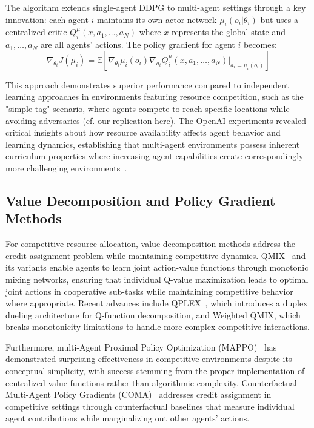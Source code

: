 The algorithm extends single-agent DDPG to multi-agent settings through a key innovation: each agent $i$ maintains its own actor network $\mu_i(o_i|\theta_i)$ but uses a centralized critic $Q_i^\mu(x, a_1, \ldots, a_N)$ where $x$ represents the global state and $a_1, \ldots, a_N$ are all agents' actions. The policy gradient for agent $i$ becomes:
\begin{equation}
    \nabla_{\theta_i} J(\mu_i) = \mathbb{E}[\nabla_{\theta_i} \mu_i(o_i) \nabla_{a_i} Q_i^\mu(x, a_1, \ldots, a_N)|_{a_i=\mu_i(o_i)}]
\end{equation}

This approach demonstrates superior performance compared to independent learning approaches in environments featuring resource competition, such as the "simple tag" scenario, where agents compete to reach specific locations while avoiding adversaries (cf. our replication here). The OpenAI experiments revealed critical insights about how resource availability affects agent behavior and learning dynamics, establishing that multi-agent environments possess inherent curriculum properties where increasing agent capabilities create correspondingly more challenging environments~\autocite{lowe_learning_2017}.

\subsection{Value Decomposition and Policy Gradient Methods}

For competitive resource allocation, value decomposition methods address the credit assignment problem while maintaining competitive dynamics. QMIX~\autocite{rashid_monotonic_2020} and its variants enable agents to learn joint action-value functions through monotonic mixing networks, ensuring that individual Q-value maximization leads to optimal joint actions in cooperative sub-tasks while maintaining competitive behavior where appropriate. Recent advances include QPLEX~\autocite{wang_qplex_2021}, which introduces a duplex dueling architecture for Q-function decomposition, and Weighted QMIX, which breaks monotonicity limitations to handle more complex competitive interactions.

Furthermore, multi-Agent Proximal Policy Optimization (MAPPO)~\autocite{yu_surprising_2022} has demonstrated surprising effectiveness in competitive environments despite its conceptual simplicity, with success stemming from the proper implementation of centralized value functions rather than algorithmic complexity. Counterfactual Multi-Agent Policy Gradients (COMA)~\autocite{foerster_counterfactual_2018} addresses credit assignment in competitive settings through counterfactual baselines that measure individual agent contributions while marginalizing out other agents' actions.

